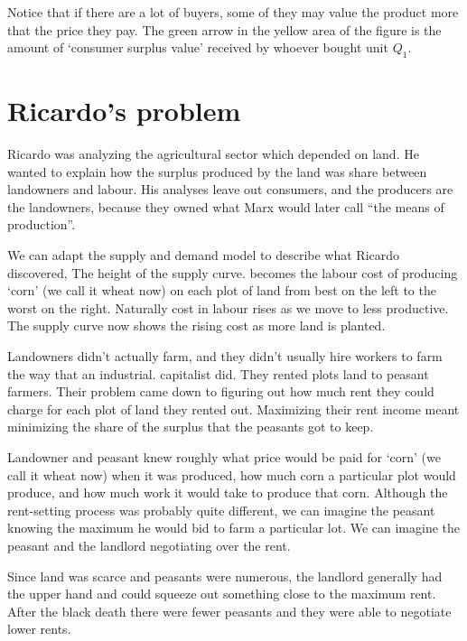 Notice that if there are a lot of buyers, some of they may value the product more  that the price they pay. The green arrow in the yellow area of the figure is the amount of `consumer surplus value' received by whoever bought unit $Q_1$.


\section{Ricardo's problem}
Ricardo was analyzing the agricultural sector which depended on land. He wanted to explain how the surplus produced by the land was share between landowners and labour. His analyses leave out consumers, and the producers are the landowners, because they owned what Marx would later call ``the means of production''. 

We can adapt the supply and demand  model to describe what Ricardo discovered,  The height of the supply curve. becomes the labour cost of producing  `corn' (we call it wheat now) on each plot of land from best on the left to the worst on the right. Naturally cost in labour rises as we move to less productive. The supply curve now shows the rising cost as more land is planted.

Landowners didn't actually farm, and they didn't usually hire workers to  farm the way that an industrial. capitalist did. They  rented plots land to peasant farmers. Their problem came down to figuring out how much rent they could charge for each plot of land they rented out. Maximizing their rent  income meant minimizing the share of the surplus that the peasants got to keep. 

Landowner and peasant knew roughly what  price would be paid for `corn' (we call it wheat now) when it was produced, how much corn a particular plot would produce, and how much work it would take to produce that corn. Although the rent-setting process was probably quite different, we can imagine the peasant knowing the maximum he would bid to farm a particular lot.  We can imagine the peasant and the landlord negotiating over the rent. 

Since land was scarce and peasants were numerous, the landlord generally had the upper hand and could squeeze out something close to the maximum rent. After the black death there were fewer peasants  and they were able to negotiate lower rents.


